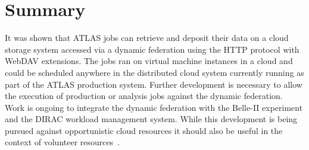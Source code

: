 \documentclass[a4paper]{jpconf}
\begin{document}
\section{Summary}
It was shown that ATLAS jobs can retrieve and deposit their data on a cloud storage system accessed via a dynamic federation using the HTTP protocol with WebDAV extensions. The jobs ran on virtual machine instances in a cloud and could be scheduled anywhere in the distributed cloud system currently running as part of the ATLAS production system. Further development is necessary to allow the execution of production or analysis jobs against the dynamic federation. Work is ongoing to integrate the dynamic federation with the Belle-II experiment and the DIRAC workload management system. While this development is being pursued against opportunistic cloud resources it should also be useful in the context of volunteer resources~\cite{boinc}.
\end{document}
